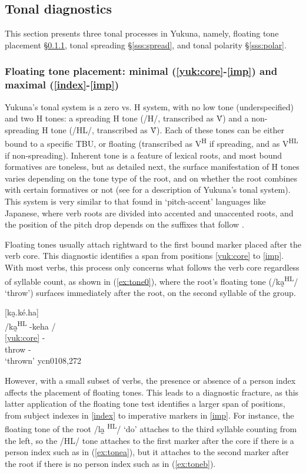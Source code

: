 \documentclass[output=paper]{langscibook}
\begin{document}
\subsection{Tonal diagnostics}
\label{ss:tone}

This section presents three tonal processes in Yukuna, namely, floating tone placement §\ref{sss:float}, tonal spreading §\ref{sss:spread}, and tonal polarity §\ref{sss:polar}. 

\subsubsection{Floating tone placement: minimal (\ref{yuk:core}-\ref{imp}) and maximal (\ref{index}-\ref{imp})} \label{sss:float}
Yukuna's tonal system is a zero vs. H system, with no low tone (underspecified) and two H tones: a spreading H tone (/H/, transcribed as V́) and a non-spreading H tone (/HL/, transcribed as V̂). Each of these tones can be either bound to a specific TBU, or floating (transcribed as V\textsuperscript{H} if spreading, and as  V\textsuperscript{HL} if non-spreading). Inherent tone is a feature of lexical roots, and most bound formatives are toneless, but as detailed next, the surface manifestation of H tones varies depending on the tone type of the root, and on whether the root combines with certain formatives or not (see \citealt{lemus2021} for a description of Yukuna's tonal system). This system is very similar to that found in `pitch-accent' languages like Japanese, where verb roots are divided into accented and unaccented roots, and the position of the pitch drop depends on the suffixes that follow \citep{Kawahara15}.

Floating tones usually attach rightward to the first bound marker placed after the verb core. This diagnostic identifies a span from positions \ref{yuk:core} to \ref{imp}. With most verbs, this process only concerns what follows the verb core regardless of syllable count, as shown in (\ref{ex:tone0}), where the root's floating tone (/ka̰\textsuperscript{HL}/ `throw') surfaces immediately after the root, on the second syllable of the group.

\ea \label{ex:tone0}
[ka̰.ké.ha] \\
    \glll /ka̰\textsuperscript{HL} -keha / \\
          \ref{yuk:core} -\\
        throw -\Ptcp{}\\
    \glt `thrown' \hfill ycn0108,272
 \z

However, with a small subset of verbs, the presence or absence of a person index affects the placement of floating tones. This leads to a diagnostic fracture, as this latter application of the floating tone test identifies a larger span of positions, from subject indexes in \ref{index} to imperative markers in \ref{imp}. For instance, the floating tone of the root /la̰ \textsuperscript{HL}/ `do' attaches to the third syllable counting from the left, so the /HL/ tone attaches to the first marker after the core if there is a person index such as in (\ref{ex:tonea}), but it attaches to the second marker after the root if there is no person index such as in (\ref{ex:toneb}). 
\end{document}
